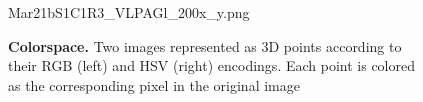 \begin{figure}
    \centering
    \vspace{1.5cm}
    Mar21bS1C1R3\_VLPAGl\_200x\_y.png   
    \caption{\textbf{Colorspace.} Two images represented as 3D points according to their RGB (left) and HSV (right) encodings. 
    Each point is colored as the corresponding pixel in the original image
    }
    \label{fig:dataset:colorspace}
\end{figure}


